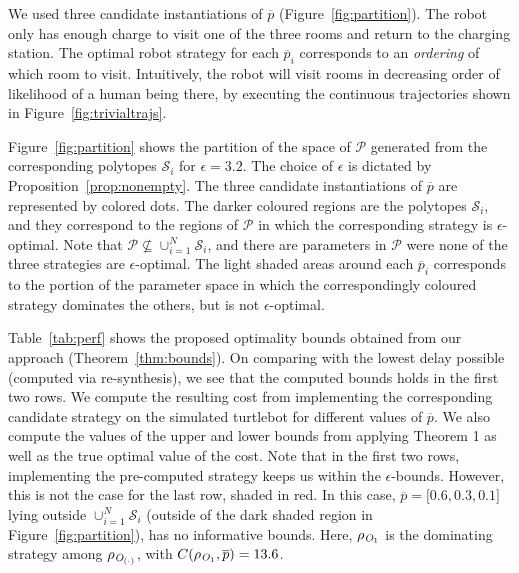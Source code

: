 
We used three candidate instantiations of $\overline{p}$ (Figure~\ref{fig:partition}). The robot only has enough charge to visit one of the three rooms and return to the charging station. The optimal robot strategy for each $\overline p_i$ corresponds to an \emph{ordering} of which room to visit. Intuitively, the robot will visit rooms in decreasing order of likelihood of a human being there, by executing the continuous trajectories shown in Figure~\ref{fig:trivialtrajs}. 


Figure~\ref{fig:partition} shows the partition of the space of $\mathcal{P}$ generated from the corresponding polytopes $\mathcal{S}_i$ for $\epsilon = 3.2$. The choice of $\epsilon$ is dictated by Proposition~\ref{prop:nonempty}. The three candidate instantiations of $\overline{p}$ are represented by colored dots. The darker coloured regions are the polytopes $\mathcal{S}_i$, and they correspond to the regions of $\mathcal{P}$ in which the corresponding strategy is $\epsilon$-optimal. Note that $\mathcal{P}\not\subseteq\cup_{i=1}^N\mathcal{S}_i$, and there are parameters in $\mathcal{P}$ were none of the three strategies are $\epsilon$-optimal. The light shaded areas around each $\overline{p}_i$ corresponds to the portion of the parameter space in which the correspondingly coloured strategy dominates the others, but is not $\epsilon$-optimal.


Table~\ref{tab:perf} shows the proposed optimality bounds obtained from our approach (Theorem~\ref{thm:bounds}). On comparing with the lowest delay possible (computed via re-synthesis), we see that the computed bounds holds in the first two rows.   
 We compute the resulting cost from implementing the corresponding candidate strategy on the simulated turtlebot for different values of $\overline{p}$. We also compute the values of the upper and lower bounds from applying Theorem 1 as well as the true optimal value of the cost. Note that in the first two rows, implementing the pre-computed strategy keeps us within the $\epsilon$-bounds. However, this is not the case for the last row, shaded in red. In this case, $\overline{p} = \lbrack 0.6,0.3,0.1 \rbrack$ lying outside $\cup_{i=1}^N\mathcal{S}_i$ (outside of the dark shaded region in Figure~\ref{fig:partition}), has no informative bounds. Here, $\rho_{\textit{O}_1}$ is the dominating strategy among $\rho_{\textit{O}_{(\cdot)}}$, with $C(\rho_{\textit{O}_1},\overline{p})=13.6$.

